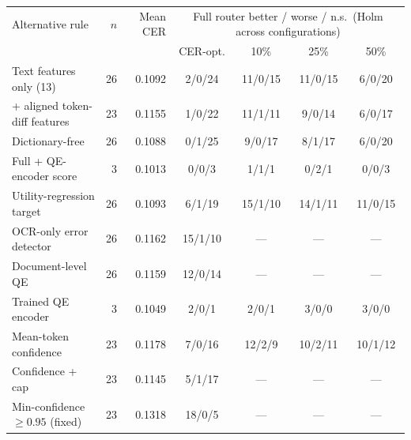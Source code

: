\begin{tabular}{lrrcccc}
\toprule
Alternative rule & $n$ & Mean CER & \multicolumn{4}{c}{Full router better / worse / n.s.\ (Holm across configurations)} \\
 & & & CER-opt. & 10\% & 25\% & 50\% \\
\midrule
Text features only (13) & 26 & 0.1092 & 2/0/24 & 11/0/15 & 11/0/15 & 6/0/20 \\
+ aligned token-diff features & 23 & 0.1155 & 1/0/22 & 11/1/11 & 9/0/14 & 6/0/17 \\
Dictionary-free & 26 & 0.1088 & 0/1/25 & 9/0/17 & 8/1/17 & 6/0/20 \\
Full + QE-encoder score & 3 & 0.1013 & 0/0/3 & 1/1/1 & 0/2/1 & 0/0/3 \\
Utility-regression target & 26 & 0.1093 & 6/1/19 & 15/1/10 & 14/1/11 & 11/0/15 \\
OCR-only error detector & 26 & 0.1162 & 15/1/10 & — & — & — \\
Document-level QE & 26 & 0.1159 & 12/0/14 & — & — & — \\
Trained QE encoder & 3 & 0.1049 & 2/0/1 & 2/0/1 & 3/0/0 & 3/0/0 \\
Mean-token confidence & 23 & 0.1178 & 7/0/16 & 12/2/9 & 10/2/11 & 10/1/12 \\
Confidence + cap & 23 & 0.1145 & 5/1/17 & — & — & — \\
Min-confidence $\ge 0.95$ (fixed) & 23 & 0.1318 & 18/0/5 & — & — & — \\
\bottomrule
\end{tabular}
